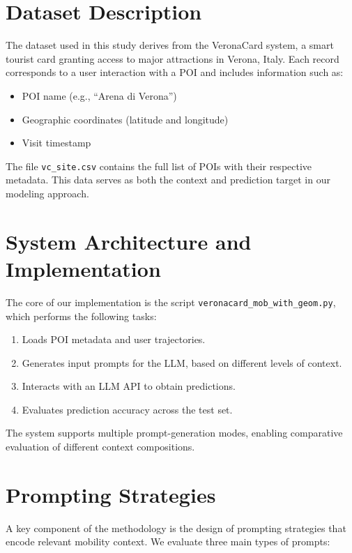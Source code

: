 \documentclass[a4paper,12pt]{article}
\begin{document}
\section{Dataset Description}

The dataset used in this study derives from the VeronaCard system, a smart tourist card granting access to major attractions in Verona, Italy. Each record corresponds to a user interaction with a POI and includes information such as:

\begin{itemize}
    \item POI name (e.g., ``Arena di Verona'')
    \item Geographic coordinates (latitude and longitude)
    \item Visit timestamp
\end{itemize}

The file \texttt{vc\_site.csv} contains the full list of POIs with their respective metadata. This data serves as both the context and prediction target in our modeling approach.

\section{System Architecture and Implementation}

The core of our implementation is the script \texttt{veronacard\_mob\_with\_geom.py}, which performs the following tasks:

\begin{enumerate}
    \item Loads POI metadata and user trajectories.
    \item Generates input prompts for the LLM, based on different levels of context.
    \item Interacts with an LLM API to obtain predictions.
    \item Evaluates prediction accuracy across the test set.
\end{enumerate}

The system supports multiple prompt-generation modes, enabling comparative evaluation of different context compositions.

\section{Prompting Strategies}

A key component of the methodology is the design of prompting strategies that encode relevant mobility context. We evaluate three main types of prompts:
\end{document}

